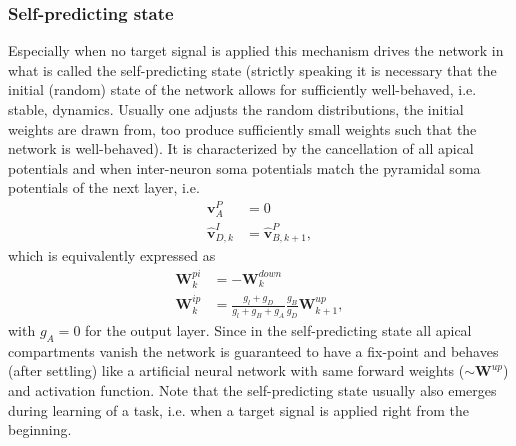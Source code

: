 \documentclass[12pt,a4paper]{article}
\begin{document}
\subsubsection{Self-predicting state}
Especially when no target signal is applied this mechanism drives the network in what is called the self-predicting state (strictly speaking it is necessary that the initial (random) state of the network allows for sufficiently well-behaved, i.e. stable, dynamics. Usually one adjusts the random distributions, the initial weights are drawn from, too produce sufficiently small weights such that the network is well-behaved). It is characterized by the cancellation of all apical potentials and when inter-neuron soma potentials match the pyramidal soma potentials of the next layer, i.e.
\begin{align}
\bm{v}^P_A &= 0\\
\hat{\bm{v}}^I_{D,k} &= \hat{\bm{v}}^P_{B,k+1},
\end{align} 
which is equivalently expressed as 
\begin{align}
\bm{W}^{pi}_k &= - \bm{W}^{down}_k \label{eq:sps_pi} \\
\bm{W}^{ip}_k &= \frac{g_l + g_D}{g_l + g_B + g_A}\frac{g_B}{g_D}\bm{W}^{up}_{k+1}, \label{eq:sps_ip}
\end{align}
with $g_A = 0$ for the output layer. Since in the self-predicting state all apical compartments vanish the network is guaranteed to have a fix-point and behaves (after settling) like a artificial neural network with same forward weights ($\sim \bm{W}^{up}$) and activation function. Note that the self-predicting state usually also emerges during learning of a task, i.e. when a target signal is applied right from the beginning.
\end{document}
